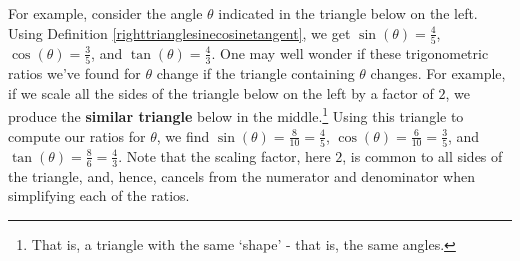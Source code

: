 \documentclass{ximera}
\begin{document}
For example, consider the angle $\theta$  indicated in the triangle below on the left.  Using Definition \ref{righttrianglesinecosinetangent},  we get $\sin(\theta) = \frac{4}{5}$, $\cos(\theta) = \frac{3}{5}$, and $\tan(\theta) = \frac{4}{3}$.   One may well wonder if these trigonometric ratios we've found for $\theta$ change if the triangle containing $\theta$ changes.  For example, if we scale all the sides of the triangle below on the left by a factor of $2$, we produce the   \textbf{similar triangle} below in the middle.\footnote{That is, a triangle with the same `shape' - that is, the same angles.}  Using this triangle to compute our ratios for $\theta$, we find $\sin(\theta) = \frac{8}{10} = \frac{4}{5}$, $\cos(\theta) = \frac{6}{10} = \frac{3}{5}$, and $\tan(\theta) = \frac{8}{6}  = \frac{4}{3}$.  Note that the scaling factor, here $2$, is common to all sides of the triangle, and, hence, cancels from the numerator and denominator when simplifying each of the ratios.  
\end{document}
